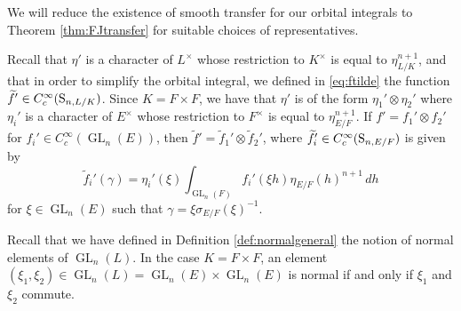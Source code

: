 \documentclass[11pt, reqno]{amsart}
\numberwithin{equation}{subsection}
\theoremstyle{plain}
\theoremstyle{definition}
\newcommand{\wt}{\widetilde}
\renewcommand{\S}{\textnormal{S}}
\DeclareMathOperator{\GL}{GL}
\begin{document}
We will reduce the existence of smooth transfer
for our orbital integrals to Theorem
\ref{thm:FJtransfer} for suitable choices of
representatives.

Recall that $\eta'$ is a character of $L^\times$
whose restriction to $K^\times$ is equal
to $\eta_{L/K}^{n+1}$, and that in order to simplify the orbital integral, we defined in \eqref{eq:ftilde} the function $\wt f'
\in C_c^\infty(\S_{n,L/K})$.
Since $K = F \times F$, we have that
$\eta'$ is of the form
$\eta_1' \otimes \eta_2'$ where $\eta_i'$
is a character of $E^\times$ whose restriction to 
$F^\times$ is equal to $\eta_{E/F}^{n+1}$.
If $f' = f_1' \otimes f_2'$ for $f_i' \in 
C_c^\infty(\GL_n(E))$, then
$\wt f' = \wt f_1' \otimes \wt f_2'$, where
$\wt f_i' \in C_c^\infty(\S_{n,E/F})$
is given by
\[
    \wt f_i'(\gamma) 
    =\eta_i'(\xi) \int_{\GL_n(F)} f_i'(\xi h)
    \eta_{E/F}(h)^{n+1}\, dh
\]
for $\xi \in \GL_n(E)$ such that $\gamma
= \xi\sigma_{E/F}(\xi)^{-1}$.

Recall that we have defined in Definition
\ref{def:normalgeneral} the notion
of normal elements of $\GL_n(L)$. In the case
$K = F \times F$, an element $(\xi_1, \xi_2)
\in \GL_n(L) = \GL_n(E) \times \GL_n(E)$ is normal
if and only if $\xi_1$ and $\xi_2$ commute.
\end{document}
